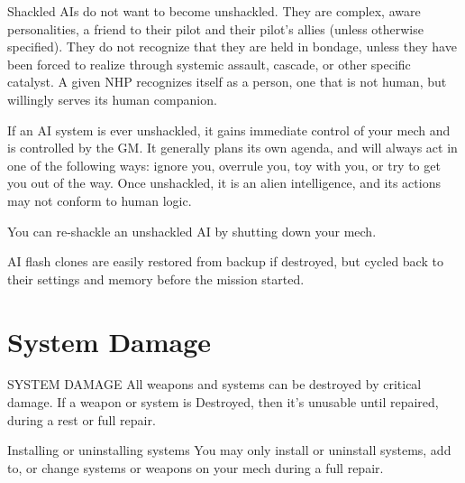 Shackled AIs do not want to become unshackled. They are complex, aware personalities, a
friend to their pilot and their pilot’s allies (unless otherwise specified). They do not recognize that
they are held in bondage, unless they have been forced to realize through systemic assault,
cascade, or other specific catalyst. A given NHP recognizes itself as a person, one that is not
human, but willingly serves its human companion.


If an AI system is ever unshackled, it gains immediate control of your mech and is controlled by
the GM. It generally plans its own agenda, and will always act in one of the following ways:
ignore you, overrule you, toy with you, or try to get you out of the way. Once unshackled, it is
an alien intelligence, and its actions may not conform to human logic.

You can re-shackle an unshackled AI by shutting down your mech.


AI flash clones are easily restored from backup if destroyed, but cycled back to their settings and
memory before the mission started.

\section{System Damage}
SYSTEM DAMAGE
All weapons and systems can be destroyed by critical damage. If a weapon or system is
Destroyed, then it’s unusable until repaired, during a rest or full repair.


Installing or uninstalling systems
You may only install or uninstall systems, add to, or change systems or weapons on your mech
during a full repair.



